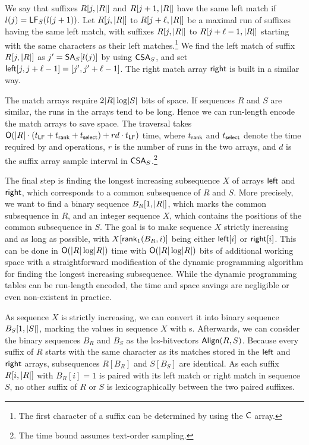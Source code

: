 We say that suffixes $R[j,\lvert R \rvert]$ and $R[j+1,\lvert R \rvert]$ have the same left
match if $l(j) = \mathsf{LF}_{S}(l(j+1))$. Let $R[j,\lvert R \rvert]$ to $R[j+\ell,\lvert R \rvert]$
be a maximal run of suffixes having the same left match, with suffixes
$R[j,\lvert R \rvert]$ to $R[j+\ell-1,\lvert R \rvert]$ starting with the same characters as
their left matches.\footnote{The first character of a suffix can be determined
by using the $\mathsf{C}$ array.} We find the left match of suffix $R[j,\lvert R \rvert]$ as
$j' = \mathsf{SA}_{S}[l(j)]$ by using $\mathsf{CSA}_{S}$, and set $\mathsf{left}[j,j+\ell-1] =
[j',j'+\ell-1]$. The right match array $\mathsf{right}$ is built in a similar way.

The match arrays require $2\lvert R \rvert \log \lvert S \rvert$ bits of space. If sequences
$R$ and $S$ are similar, the runs in the arrays tend to be long. Hence we can
run-length encode the match arrays to save space. The traversal takes
$\mathsf{O}(\lvert R \rvert \cdot (t_{\mathsf{LF}} + t_{\mathsf{rank}} + t_{\mathsf{select}}) + rd \cdot
t_{\mathsf{LF}})$ time, where $t_{\mathsf{rank}}$ and $t_{\mathsf{select}}$ denote the time
required by \rank{} and \select{} operations, $r$ is the number of runs in the
two arrays, and $d$ is the suffix array sample interval in
$\mathsf{CSA}_{S}$.\footnote{The time bound assumes text-order sampling.}

The final step is finding the longest increasing subsequence $X$ of arrays
$\mathsf{left}$ and $\mathsf{right}$, which corresponds to a common subsequence of $R$ and
$S$. More precisely, we want to find a binary sequence $B_{R}[1,\lvert R \rvert]$,
which marks the common subsequence in $R$, and an integer sequence $X$, which
contains the positions of the common subsequence in $S$. The goal is to make
sequence $X$ strictly increasing and as long as possible, with
$X[\mathsf{rank}_{1}(B_{R}, i)]$ being either $\mathsf{left}[i]$ or $\mathsf{right}[i]$. This can
be done in $\mathsf{O}(\lvert R \rvert \log \lvert R \rvert)$ time with $\mathsf{O}(\lvert R \rvert \log \lvert R \rvert)$
bits of additional working space with a straightforward modification of the
dynamic programming algorithm for finding the longest increasing subsequence.
While the dynamic programming tables can be run-length encoded, the time and
space savings are negligible or even non-existent in practice.

As sequence $X$ is strictly increasing, we can convert it into binary sequence
$B_{S}[1,\lvert S \rvert]$, marking the values in sequence $X$ with \onebit{}s.
Afterwards, we can consider the binary sequences $B_{R}$ and $B_{S}$ as the
lcs-bitvectors $\mathsf{Align}(R,S)$. Because every suffix of $R$ starts with the same
character as its matches stored in the $\mathsf{left}$ and $\mathsf{right}$ arrays,
subsequences $R[B_{R}]$ and $S[B_{S}]$ are identical. As each suffix
$R[i,\lvert R \rvert]$ with $B_{R}[i] = 1$ is paired with its left match or right
match in sequence $S$, no other suffix of $R$ or $S$ is lexicographically
between the two paired suffixes.

